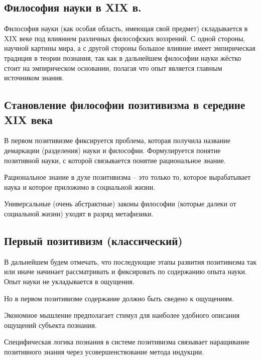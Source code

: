\documentclass[main.tex]{subfiles}
\begin{document}
\subsection{Философия науки в XIX в.}


Философия науки (как особая область, имеющая свой предмет) складывается в XIX веке под влиянием различных философских воззрений.
С одной стороны, научной картины мира, а с другой стороны большое влияние имеет эмпирическая традиция в теории познания, так как в дальнейшем философии науки жёстко стоит на эмпирическом основании, полагая что опыт является главным источником знания.

\subsection{Становление философии позитивизма в середине XIX века}


В первом позитивизме фиксируется проблема, которая получила название демаркации (разделения) науки и философии.
Формулируется понятие позитивной науки, с которой связывается понятие рациональное знание.

Рациональное знание в духе позитивизма -- это только то, которое вырабатывает наука и которое приложимо в социальной жизни.

Универсальные (очень абстрактные) законы философии (которые далеки от социальной жизни) уходят в разряд метафизики.

\subsection{Первый позитивизм (классический)}


В дальнейшем будем отмечать, что последующие этапы развития позитивизма так или иначе начинает рассматривать и фиксировать по содержанию опыта науки.
Опыт науки не укладывается в ощущения.

Но в первом позитивизме содержание должно быть сведено к ощущениям.

Экономное мышление предполагает стимул для наиболее удобного описания ощущений субъекта познания.

Специфическая логика познания в системе позитивизма связывает наращивание позитивного знания через усовершенствование метода индукции.
\end{document}
